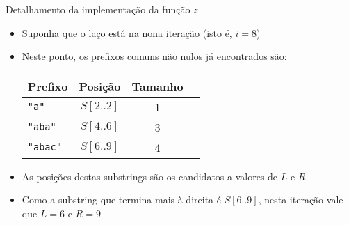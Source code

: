 \begin{frame}[fragile]{Detalhamento da implementação da função $z$}

    \begin{itemize}
        \item Suponha que o laço  está na nona iteração (isto é, $i = 8$)

        \item Neste ponto, os prefixos comuns não nulos já encontrados são:

        \vspace{0.1in}
        \begin{center}
            \begin{tabularx}{0.7\textwidth}{Xccc}
            \toprule
            \textbf{Prefixo} & \textbf{Posição} & \textbf{Tamanho} \\
            \midrule
            \textcolor{red!80!black}{\verb|"a"|} & $S[2..2]$ & 1 \\
            \textcolor{red!80!black}{\verb|"aba"|} & $S[4..6]$ & 3 \\
            \textcolor{red!80!black}{\verb|"abac"|} & $S[6..9]$ & 4 \\
            \bottomrule
            \end{tabularx}
        \end{center}
        \vspace{0.1in}

        \item As posições destas substrings são os candidatos a valores de $L$ e $R$

        \item Como a substring que termina mais à direita é $S[6..9]$, nesta iteração vale que
            $L = 6$ e $R = 9$
    \end{itemize}

\end{frame}

